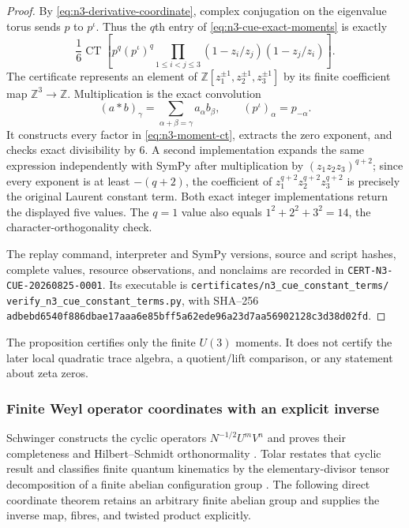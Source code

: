 \begin{proof}
By \eqref{eq:n3-derivative-coordinate}, complex conjugation on the eigenvalue torus sends
$p$ to $p^\iota$.  Thus the $q$th entry of \eqref{eq:n3-cue-exact-moments} is exactly
\begin{equation}
 \frac16\operatorname{CT}\!\left[
 p^q(p^\iota)^q
 \prod_{1\le i<j\le3}(1-z_i/z_j)(1-z_j/z_i)
 \right].
 \label{eq:n3-moment-ct}
\end{equation}
The certificate represents an element of
$\mathbb Z[z_1^{\pm1},z_2^{\pm1},z_3^{\pm1}]$ by its finite coefficient map
$\mathbb Z^3\to\mathbb Z$.  Multiplication is the exact convolution
\begin{equation}
 (a*b)_\gamma=\sum_{\alpha+\beta=\gamma}a_\alpha b_\beta,
 \qquad
 (p^\iota)_\alpha=p_{-\alpha}.
 \label{eq:n3-sparse-convolution}
\end{equation}
It constructs every factor in \eqref{eq:n3-moment-ct}, extracts the zero exponent, and checks
exact divisibility by $6$.  A second implementation expands the same expression independently
with SymPy after multiplication by
$(z_1z_2z_3)^{q+2}$; since every exponent is at least $-(q+2)$, the coefficient of
$z_1^{q+2}z_2^{q+2}z_3^{q+2}$ is precisely the original Laurent constant term.  Both exact
integer implementations return the displayed five values.  The $q=1$ value also equals
$1^2+2^2+3^2=14$, the character-orthogonality check.

The replay command, interpreter and SymPy versions, source and script hashes, complete values,
resource observations, and nonclaims are recorded in
\texttt{CERT-N3-CUE-20260825-0001}.  Its executable is
\texttt{certificates/n3\_cue\_constant\_terms/}\allowbreak
\texttt{verify\_n3\_cue\_constant\_terms.py}, with SHA--256
\texttt{adbebd6540f886dbae17aaa6e85bff5a62ede96a23d7aa56902128c3d38d02fd}.
\end{proof}

The proposition certifies only the finite $U(3)$ moments.  It does not certify the later local
quadratic trace algebra, a quotient/lift comparison, or any statement about zeta zeros.

\subsubsection{Finite Weyl operator coordinates with an explicit inverse}

Schwinger constructs the cyclic operators
$N^{-1/2}U^mV^n$ and proves their completeness and Hilbert--Schmidt orthonormality
\cite[pp.~575--576]{schwinger1960}.  Tolar restates that cyclic result and classifies finite
quantum kinematics by the elementary-divisor tensor decomposition of a finite abelian
configuration group \cite[Secs.~2--3]{tolar2014}.  The following direct coordinate theorem
retains an arbitrary finite abelian group and supplies the inverse map, fibres, and twisted
product explicitly.

